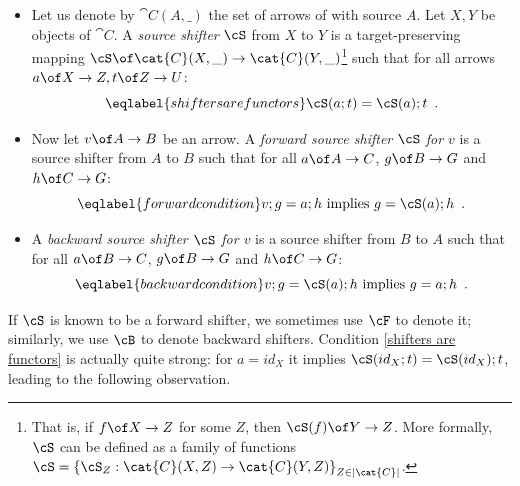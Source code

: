 \begin{definition}
\begin{itemize}[topsep=\smallskipamount]
\item Let us denote by $\cat{C}(A,\_)$ the set of arrows of  with source $A$. Let $X,Y$ be objects of $\cat{C}$. A \emph{source shifter} $\cS$ from $X$ to $Y$ is a target-preserving mapping $\cS \of \cat{C}(X,\_) \to \cat{C}(Y, \_)$\footnote{That is, if $f\of X \to Z$ for some $Z$, then $\cS(f)\of Y \to Z$. More formally, $\cS$  can be defined as a family of functions $\cS = \left\{\cS_Z : \cat{C}(X, Z) \to \cat{C}(Y, Z)\right\}_{Z\in |\cat{C}|}$.} such that for all arrows $a\of X\to Z, t\of Z\to U$:
%
%
\begin{equation}\eqlabel{shifters are functors}
\cS(a;t) = \cS(a);t \enspace.
\end{equation}
%
\item Now let $v\of A\to B$ be an arrow. A \emph{forward source shifter $\cS$ for $v$} is a source shifter from $A$ to $B$ such that for all $a\of A\to C$, $g\of B\to G$ and $h\of C\to G$:
%
\begin{equation}\eqlabel{forward condition}
v;g = a;h \text{ implies } g = \cS(a);h \enspace.
\end{equation}
%
\item A \emph{backward source shifter $\cS$ for $v$} is a source shifter from $B$ to $A$ such that for all $a\of B\to C$, $g\of B\to G$ and $h\of C\to G$:
%
\begin{equation}\eqlabel{backward condition}
v;g = \cS(a);h \text{ implies } g = a;h \enspace.
\end{equation}
\end{itemize}
\end{definition}
%
If $\cS$ is known to be a forward shifter, we sometimes use $\cF$ to denote it; similarly, we use $\cB$ to denote backward shifters. 
Condition \eqref{shifters are functors} is actually quite strong: for $a = id_X$ it implies $\cS(id_X;t) = \cS(id_X);t$,  leading to the following observation.

